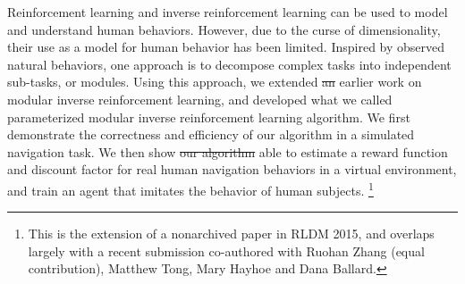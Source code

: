 \documentclass[12pt]{report}	%
\theoremstyle{definition}
\theoremstyle{remark}
\providecommand{\DIFadd}[1]{{\protect\color{blue}\uwave{#1}}} %
\providecommand{\DIFdel}[1]{{\protect\color{red}\sout{#1}}}                      %
\providecommand{\DIFaddbegin}{} %
\providecommand{\DIFaddend}{} %
\providecommand{\DIFdelbegin}{} %
\providecommand{\DIFdelend}{} %
\begin{document}
%
\utabstract
{}%
Reinforcement learning and inverse reinforcement learning can be used to model
and understand human behaviors. However, due to the curse of dimensionality,
their use as a model for human behavior has been limited. Inspired by observed
natural behaviors, one approach is to decompose complex tasks into independent
sub-tasks, or modules. Using this approach, we extended \DIFdelbegin \DIFdel{an }\DIFdelend earlier work on 
modular inverse reinforcement learning, and developed what we called
\DIFaddbegin \DIFadd{a }\DIFaddend parameterized modular inverse reinforcement learning algorithm. We first
demonstrate the correctness and efficiency of our algorithm in a simulated
navigation task. We then show \DIFdelbegin \DIFdel{our algorithm }\DIFdelend \DIFaddbegin \DIFadd{that our algorithm is }\DIFaddend able to estimate a reward function
and discount factor for real human navigation behaviors in a virtual
environment, and train an agent that imitates the behavior of human subjects.
\footnote{This is the extension of a nonarchived paper in RLDM 2015, and
overlaps largely with a recent submission co-authored with Ruohan Zhang (equal
contribution), Matthew Tong, Mary Hayhoe and Dana Ballard.}
\indent

\tableofcontents   %

\listoftables      %
\listoffigures     %



%
%
\end{document}
